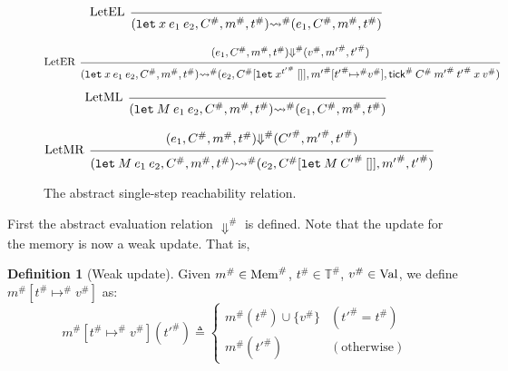 \documentclass[acmsmall,screen,review]{acmart}
\theoremstyle{definition}
\newtheorem{definition}{Definition}[section]
\newcommand*{\A}[1]{{#1}^{\#}}
\newcommand*{\Time}{\mathbb{T}}
\newcommand*{\ATime}{\A{\Time}}
\newcommand*{\Value}[1]{\text{Val}\vphantom{#1}}
\newcommand*{\mem}{m}
\newcommand*{\AMem}[1]{\A{\text{Mem}}\vphantom{#1}}
\newcommand*{\tick}{\mathsf{tick}}
\begin{document}
\begin{figure}[htb]
  \[
    \begin{prooftree}
      \infer[left label=LetEL]0{
      (\mathtt{let}\:x\:e_1\:e_2, \A{C}, \A{\mem}, \A{t})
      \A\rightsquigarrow
      (e_{1}, \A{C}, \A{\mem}, \A{t})
      }
    \end{prooftree}
  \]

  \[
    \begin{prooftree}
      \hypo{
        \begin{matrix}
          (e_{1}, \A{C}, \A{\mem}, \A{t})
          \A\Downarrow
          (\A{v}, \A{\mem'}, \A{t'})
        \end{matrix}
      }
      \infer[left label=LetER]1{
      (\mathtt{let}\:x\:e_1\:e_2, \A{C}, \A{\mem}, \A{t})
      \A\rightsquigarrow
      (e_{2}, \A{C}[\mathtt{let}\:x^{\A{t'}}\:[]], \A{\mem'}[\A{t'}\A{\mapsto} \A{v}], \A{\tick}\:\A{C}\:\A{\mem'}\:\A{t'}\:x\:\A{v})
      }
    \end{prooftree}
  \]

  \[
    \begin{prooftree}
      \infer[left label=LetML]0{
      (\mathtt{let}\:M\:e_{1}\:e_{2}, \A{C}, \A{\mem}, \A{t})
      \A\rightsquigarrow
      (e_{1}, \A{C}, \A{\mem}, \A{t})
      }
    \end{prooftree}
  \]

  \[
    \begin{prooftree}
      \hypo{
        \begin{matrix}
          (e_{1}, \A{C}, \A{\mem}, \A{t})
          \A\Downarrow
          (\A{C'}, \A{\mem'}, \A{t'})
        \end{matrix}
      }
      \infer[left label=LetMR]1{
      (\mathtt{let}\:M\:e_{1}\:e_{2}, \A{C}, \A{\mem}, \A{t})
      \A\rightsquigarrow
      (e_{2}, \A{C}[\mathtt{let}\:M\:\A{C'}\:[]], \A{\mem'}, \A{t'})
      }
    \end{prooftree}
  \]
  \caption{The abstract single-step reachability relation.}
  \label{fig:absreach}
\end{figure}

First the abstract evaluation relation $\A{\Downarrow}$ is defined.
Note that the update for the memory is now a weak update. That is,
\begin{definition}[Weak update]
  Given $\A{\mem}\in\AMem{\ATime}$, $\A{t}\in\ATime$, $\A{v}\in\Value{\ATime}$, we define $\A{\mem}[\A{t}\A{\mapsto}\A{v}]$ as:
  \[
    \A{\mem}[\A{t}\A{\mapsto}\A{v}](\A{t'})\triangleq
    \begin{cases}
      \A{\mem}(\A{t})\cup\{\A{v}\} & (\A{t'}=\A{t})     \\
      \A{\mem}(\A{t'})             & (\text{otherwise})
    \end{cases}
  \]
\end{definition}
\end{document}
